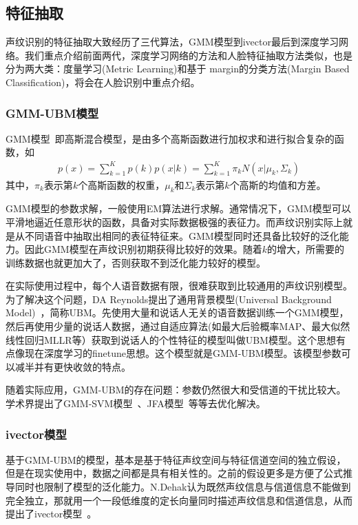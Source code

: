 \subsection{特征抽取}
声纹识别的特征抽取大致经历了三代算法，GMM模型到ivector最后到深度学习网络。我们重点介绍前面两代，深度学习网络的方法和人脸特征抽取方法类似，也是分为两大类：度量学习(Metric Learning)和基于 margin的分类方法(Margin Based Classification)，将会在人脸识别中重点介绍。

\subsubsection{GMM-UBM模型}
GMM模型~\cite{reynolds1995speaker}即高斯混合模型，是由多个高斯函数进行加权求和进行拟合复杂的函数，如
\begin{equation}
\label{eq:gmm}
\begin{aligned}
p(x) = \sum_{k=1}^K p(k)p(x|k) = \sum_{k=1}^K \pi_k N(x|\mu_k, \Sigma_k)
\end{aligned}
\end{equation}
其中，$\pi_k$表示第$k$个高斯函数的权重，$\mu_k$和$\Sigma_k$表示第$k$个高斯的均值和方差。

GMM模型的参数求解，一般使用EM算法进行求解。通常情况下，GMM模型可以平滑地逼近任意形状的函数，具备对实际数据极强的表征力。而声纹识别实际上就是从不同语音中抽取出相同的表征特征来。GMM模型同时还具备比较好的泛化能力。因此GMM模型在声纹识别初期获得比较好的效果。随着$k$的增大，所需要的训练数据也就更加大了，否则获取不到泛化能力较好的模型。

在实际使用过程中，每个人语音数据有限，很难获取到比较通用的声纹识别模型。为了解决这个问题，DA Reynolds提出了通用背景模型(Universal Background Model)~\cite{reynolds2000speaker}，简称UBM。先使用大量和说话人无关的语音数据训练一个GMM模型，然后再使用少量的说话人数据，通过自适应算法(如最大后验概率MAP、最大似然线性回归MLLR等）获取到说话人的个性特征的模型叫做UBM模型。这个思想有点像现在深度学习的finetune思想。这个模型就是GMM-UBM模型。该模型参数可以减半并有更快收敛的特点。

随着实际应用，GMM-UBM的存在问题：参数仍然很大和受信道的干扰比较大。学术界提出了GMM-SVM模型~\cite{campbell2006svm}、JFA模型~\cite{kenny2005joint}等等去优化解决。

\subsubsection{ivector模型}
基于GMM-UBM的模型，基本是基于特征声纹空间与特征信道空间的独立假设，但是在现实使用中，数据之间都是具有相关性的。之前的假设更多是方便了公式推导同时也限制了模型的泛化能力。N.Dehak认为既然声纹信息与信道信息不能做到完全独立，那就用一个一段低维度的定长向量同时描述声纹信息和信道信息，从而提出了ivector模型~\cite{dehak2010front}。

